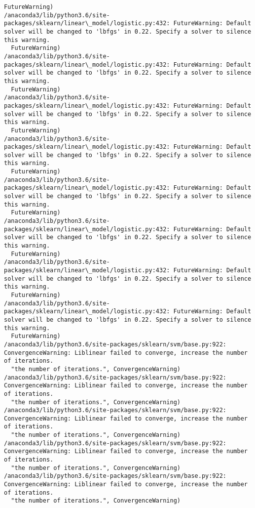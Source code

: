 \documentclass[11pt]{article}
\begin{document}
\begin{Verbatim}[commandchars=\\\{\}]
  FutureWarning)
/anaconda3/lib/python3.6/site-packages/sklearn/linear\_model/logistic.py:432: FutureWarning: Default solver will be changed to 'lbfgs' in 0.22. Specify a solver to silence this warning.
  FutureWarning)
/anaconda3/lib/python3.6/site-packages/sklearn/linear\_model/logistic.py:432: FutureWarning: Default solver will be changed to 'lbfgs' in 0.22. Specify a solver to silence this warning.
  FutureWarning)
/anaconda3/lib/python3.6/site-packages/sklearn/linear\_model/logistic.py:432: FutureWarning: Default solver will be changed to 'lbfgs' in 0.22. Specify a solver to silence this warning.
  FutureWarning)
/anaconda3/lib/python3.6/site-packages/sklearn/linear\_model/logistic.py:432: FutureWarning: Default solver will be changed to 'lbfgs' in 0.22. Specify a solver to silence this warning.
  FutureWarning)
/anaconda3/lib/python3.6/site-packages/sklearn/linear\_model/logistic.py:432: FutureWarning: Default solver will be changed to 'lbfgs' in 0.22. Specify a solver to silence this warning.
  FutureWarning)
/anaconda3/lib/python3.6/site-packages/sklearn/linear\_model/logistic.py:432: FutureWarning: Default solver will be changed to 'lbfgs' in 0.22. Specify a solver to silence this warning.
  FutureWarning)
/anaconda3/lib/python3.6/site-packages/sklearn/linear\_model/logistic.py:432: FutureWarning: Default solver will be changed to 'lbfgs' in 0.22. Specify a solver to silence this warning.
  FutureWarning)
/anaconda3/lib/python3.6/site-packages/sklearn/linear\_model/logistic.py:432: FutureWarning: Default solver will be changed to 'lbfgs' in 0.22. Specify a solver to silence this warning.
  FutureWarning)
/anaconda3/lib/python3.6/site-packages/sklearn/svm/base.py:922: ConvergenceWarning: Liblinear failed to converge, increase the number of iterations.
  "the number of iterations.", ConvergenceWarning)
/anaconda3/lib/python3.6/site-packages/sklearn/svm/base.py:922: ConvergenceWarning: Liblinear failed to converge, increase the number of iterations.
  "the number of iterations.", ConvergenceWarning)
/anaconda3/lib/python3.6/site-packages/sklearn/svm/base.py:922: ConvergenceWarning: Liblinear failed to converge, increase the number of iterations.
  "the number of iterations.", ConvergenceWarning)
/anaconda3/lib/python3.6/site-packages/sklearn/svm/base.py:922: ConvergenceWarning: Liblinear failed to converge, increase the number of iterations.
  "the number of iterations.", ConvergenceWarning)
/anaconda3/lib/python3.6/site-packages/sklearn/svm/base.py:922: ConvergenceWarning: Liblinear failed to converge, increase the number of iterations.
  "the number of iterations.", ConvergenceWarning)

\end{Verbatim}
\end{document}
